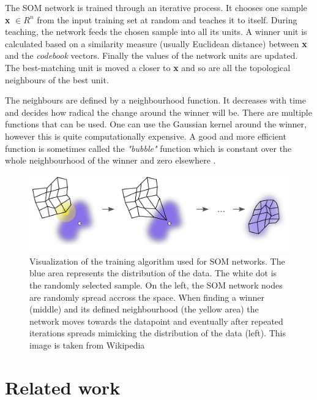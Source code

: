 The SOM network is trained through an iterative process. It chooses one sample \textbf{x} \( \in R^n \) from the input training set at random and teaches it to itself. During teaching, the network feeds the chosen sample into all its units. A winner unit is calculated based on a similarity measure (usually Euclidean distance) between \textbf{x} and the \textit{codebook} vectors. Finally the values of the network units are updated. The best-matching unit is moved a closer to \textbf{x} and so are all the topological neighbours of the best unit.

The neighbours are defined by a neighbourhood function. It decreases with time and decides how radical the change around the winner will be. There are multiple functions that can be used. One can use the Gaussian kernel around the winner, however this is quite computationally expensive. A good and more efficient function is sometimes called the \textit{"bubble"} function which is constant over the whole neighbourhood of the winner and zero elsewhere \cite{SOM_training}.
\begin{figure}[H]
\begin{minipage}{\textwidth}
    \centering
	\includegraphics[width=140mm]{./img/Somtraining.png}
	\caption[A visualization of the training used for SOM networks]{Visualization of the training algorithm used for SOM networks. The blue area represents the distribution of the data. The white dot is the randomly selected sample. On the left, the SOM network nodes are randomly spread accross the space. When finding a winner (middle) and its defined neighbourhood (the yellow area) the network moves towards the datapoint and eventually after repeated iterations spreads mimicking the distribution of the data (left). This image is taken from Wikipedia\footnotemark}
	\label{fig:som_training}
\end{minipage}
\end{figure}


\section{Related work}\label{sec:text_related_work}

